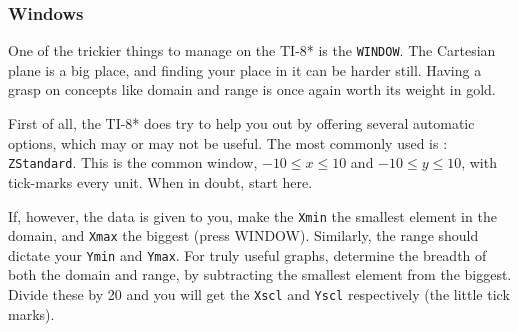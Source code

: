 
\subsubsection{Windows}
One of the trickier things to manage on the TI-8* is the \texttt{WINDOW}.  The Cartesian plane is 
a big place, and finding your place in it can be harder still.  Having a grasp
on concepts like \gls{domain} and \gls{range} is once again worth its weight in gold.


First of all, the TI-8* does try to help you out by offering several automatic options, which 
may or may not be  useful.  The most commonly used is 
\Touche[style=graph,principal=zoom,position=0.9,raise=-5pt]
\Touche[style=number, principal=6,raise=-5pt]: \texttt{ZStandard}.  This is the common window, 
$-10\le x\le 10$ and $-10\le y\le 10$, with tick-marks every unit.  When in doubt, start here.

If, however, the data is given to you, make the \texttt{Xmin} the smallest element in the domain,
and \texttt{Xmax} the biggest (press WINDOW).  Similarly, the range should dictate your \texttt{Ymin} and 
\texttt{Ymax}.  For truly useful graphs, determine the breadth of both the domain and range, 
by subtracting the smallest element from the biggest.  Divide these by 20 and you will get
the \texttt{Xscl} and \texttt{Yscl} respectively (the little tick marks).

